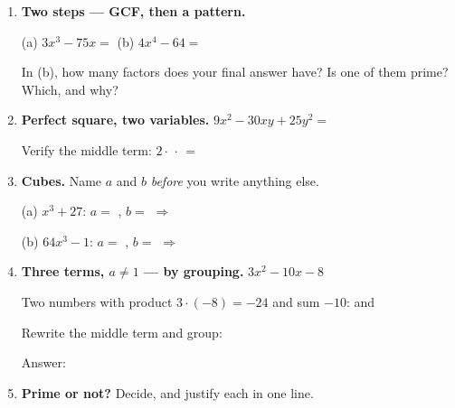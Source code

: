 \documentclass[10pt]{article}
\begin{document}
\begin{tcolorbox}[colback=white, colframe=black!40, title=\textbf{Tier A --- Approaching Proficiency},
    fonttitle=\bfseries, arc=1.5mm, left=3mm, right=3mm, top=2mm, bottom=2mm, breakable]
\begin{enumerate}[leftmargin=1.7em, itemsep=10pt]
  \item \textbf{Two steps --- GCF, then a pattern.}

    \vspace{2pt}
    (a) $3x^3 - 75x = $  \qquad (b) $4x^4 - 64 = $ 

    \vspace{2pt}
    In (b), how many factors does your final answer have?  \; Is one of them prime?
    Which, and why? 

  \item \textbf{Perfect square, two variables.} $9x^2 - 30xy + 25y^2 = $ 

    \vspace{2pt}
    Verify the middle term: $2 \cdot$  $\cdot$  $= $ 

  \item \textbf{Cubes.} Name $a$ and $b$ \emph{before} you write anything else.

    \vspace{3pt}
    (a) $x^3 + 27$: \quad $a = $ , \; $b = $  \quad $\Rightarrow$

    \vspace{3pt}
    (b) $64x^3 - 1$: \quad $a = $ , \; $b = $  \quad $\Rightarrow$

  \item \textbf{Three terms, $a \ne 1$ --- by grouping.} $3x^2 - 10x - 8$

    \vspace{2pt}
    Two numbers with product $3 \cdot (-8) = -24$ and sum $-10$:  and 

    \vspace{2pt}
    Rewrite the middle term and group: 

    \vspace{2pt}
    Answer: 

  \item \textbf{Prime or not?} Decide, and justify each in one line.


\end{enumerate}
\end{tcolorbox}
\end{document}
